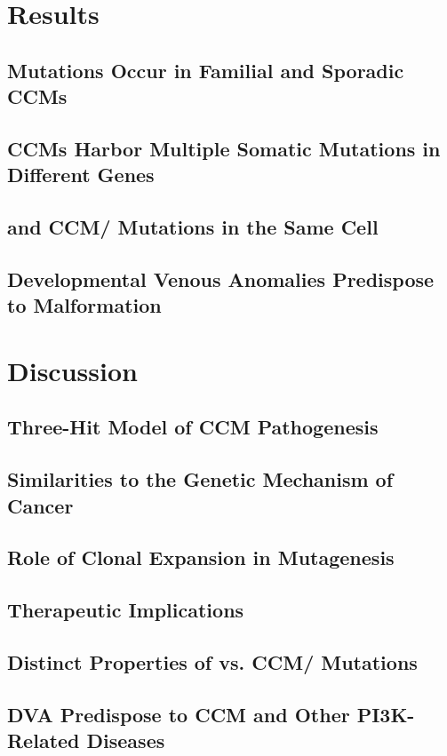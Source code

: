 \section{Results}
\subsection{ Mutations Occur in Familial and Sporadic CCMs}
\subsection{CCMs Harbor Multiple Somatic Mutations in Different Genes}
\subsection{ and CCM/ Mutations in the Same Cell}
\subsection{Developmental Venous Anomalies Predispose to Malformation}

\section{Discussion}
\subsection{Three-Hit Model of CCM Pathogenesis}
\subsection{Similarities to the Genetic Mechanism of Cancer}
\subsection{Role of Clonal Expansion in Mutagenesis}
\subsection{Therapeutic Implications}
\subsection{Distinct Properties of  vs. CCM/ Mutations}
\subsection{DVA Predispose to CCM and Other PI3K-Related Diseases}

